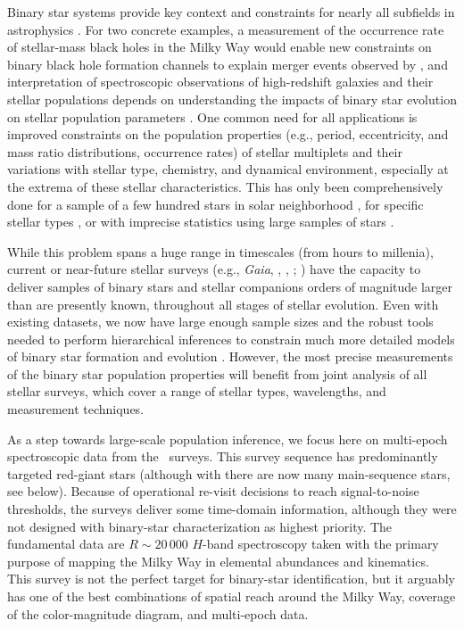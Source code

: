 \documentclass[modern]{aastex63}
\begin{document}
Binary star systems provide key context and constraints for nearly all subfields
in astrophysics \citep[e.g.,][]{Breivik:BAAS, Rix:BAAS}.
For two concrete examples, a measurement of the occurrence rate of stellar-mass
black holes in the Milky Way would enable new constraints on binary black hole
formation channels to explain merger events observed by 
\citep{LIGO:BH1, LIGO:catalog}, and interpretation of spectroscopic observations
of high-redshift galaxies and their stellar populations depends on understanding
the impacts of binary star evolution on stellar population parameters
\cite[e.g.,][]{Eldridge:2017}.
One common need for all applications is improved constraints on the population
properties (e.g., period, eccentricity, and mass ratio distributions, occurrence
rates) of stellar multiplets and their variations with stellar type, chemistry,
and dynamical environment, especially at the extrema of these stellar
characteristics.
This has only been comprehensively done for a sample of a few hundred stars in
solar neighborhood \citep{Raghavan:2010}, for specific stellar types
\citep[e.g.,][]{Moe:2017}, or with imprecise statistics using large samples of
stars \citep{Badenes:2018}.

While this problem spans a huge range in timescales (from hours to millenia),
current or near-future stellar surveys (e.g., \textit{Gaia}, \apogee,
, ; \citealt{Gaia-Collaboration:2016,
Gaia-Collaboration:2018, Majewski:2017, Zhao:2012, Kollmeier:2017}) have the
capacity to deliver samples of binary stars and stellar companions orders of
magnitude larger than are presently known, throughout all stages of stellar
evolution.
Even with existing datasets, we now have large enough sample sizes and the
robust tools needed to perform hierarchical inferences to constrain much more
detailed models of binary star formation and evolution \citep[e.g.,][]{Moe:2018,
El-Badry:2019a}.
However, the most precise measurements of the binary star population properties
will benefit from joint analysis of all stellar surveys, which cover a range of
stellar types, wavelengths, and measurement techniques.

As a step towards large-scale population inference, we focus here on multi-epoch
spectroscopic data from the \apogee\ surveys.
This survey sequence has predominantly targeted red-giant stars (although with
 there are now many main-sequence stars, see below).
Because of operational re-visit decisions to reach signal-to-noise thresholds,
the surveys deliver some time-domain information, although they were not
designed with binary-star characterization as highest priority.
The fundamental data are $R\sim 20\,000$ $H$-band spectroscopy taken with the
primary purpose of mapping the Milky Way in elemental abundances and kinematics.
This survey is not the perfect target for binary-star identification, but it
arguably has one of the best combinations of spatial reach around the Milky Way,
coverage of the color-magnitude diagram, and multi-epoch data.
\end{document}
